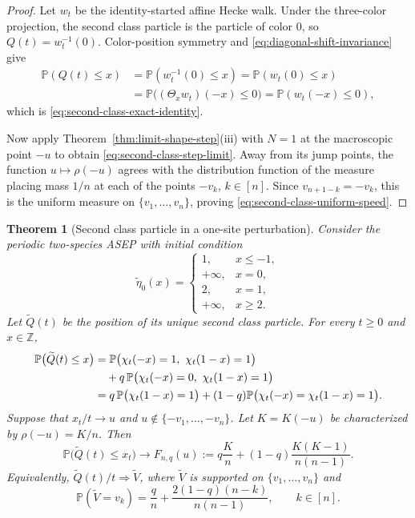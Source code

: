 \documentclass[11pt,a4paper]{amsart}
\newtheorem{theorem}{Theorem}[section]
\theoremstyle{definition}
\theoremstyle{remark}
\numberwithin{equation}{section}
\newcommand{\Z}{\mathbb Z}
\newcommand{\Pp}{\mathbb P}
\begin{document}
	\begin{proof}
		Let $w_t$ be the identity-started affine Hecke walk.  Under the three-color
		projection, the second class particle is the particle of color $0$, so
		$Q(t)=w_t^{-1}(0)$.  Color-position symmetry and
		\eqref{eq:diagonal-shift-invariance} give
		\begin{align*}
			\Pp(Q(t)\le x)
			&=\Pp(w_t^{-1}(0)\le x)
			=\Pp(w_t(0)\le x)\\
			&=\Pp\bigl((\Theta_xw_t)(-x)\le0\bigr)
			=\Pp(w_t(-x)\le0),
		\end{align*}
		which is \eqref{eq:second-class-exact-identity}.
		
		Now apply Theorem~\ref{thm:limit-shape-step}(iii) with $N=1$ at the
		macroscopic point $-u$ to obtain \eqref{eq:second-class-step-limit}.  Away from its jump points, the function $u\mapsto\rho(-u)$ agrees with
		the distribution function of the measure placing mass $1/n$ at each of the
		points $-v_k$, $k\in[n]$.  Since $v_{n+1-k}=-v_k$, this is the uniform
		measure on $\{v_1,\ldots,v_n\}$, proving
		\eqref{eq:second-class-uniform-speed}.
	\end{proof}
	
	\begin{theorem}[Second class particle in a one-site perturbation]
		\label{thm:shifted-second-class}
		Consider the periodic two-species ASEP with initial condition
		\begin{equation}\label{eq:shifted-second-class-initial}
			\widetilde\eta_0(x)=
			\begin{cases}
				1,&x\le-1,\\
				+\infty,&x=0,\\
				2,&x=1,\\
				+\infty,&x\ge2.
			\end{cases}
		\end{equation}
		Let $\widetilde Q(t)$ be the position of its unique second class particle.
		For every $t\ge0$ and $x\in\Z$,
		\begin{align}
			\Pp\bigl(\widetilde Q(t)\le x\bigr)
			&=\Pp\bigl(\chi_t(-x)=1,\ \chi_t(1-x)=1\bigr)\notag\\
			&\quad+q\,\Pp\bigl(\chi_t(-x)=0,\ \chi_t(1-x)=1\bigr)
			\label{eq:shifted-second-class-exact-identity}\\
			&=q\,\Pp\bigl(\chi_t(1-x)=1\bigr)
			+(1-q)\Pp\bigl(\chi_t(-x)=\chi_t(1-x)=1\bigr).
			\notag
		\end{align}
		Suppose that $x_t/t\to u$ and
		$u\notin\{-v_1,\ldots,-v_n\}$.  Let $K=K(-u)$ be characterized by
		$\rho(-u)=K/n$.  Then
		\begin{equation}\label{eq:shifted-second-class-limit}
			\Pp\bigl(\widetilde Q(t)\le x_t\bigr)
			\longrightarrow
			F_{n,q}(u)
			:=q\frac Kn+(1-q)\frac{K(K-1)}{n(n-1)}.
		\end{equation}
		Equivalently, $\widetilde Q(t)/t\Rightarrow\widetilde V$, where
		$\widetilde V$ is supported on $\{v_1,\ldots,v_n\}$ and
		\begin{equation}\label{eq:shifted-second-class-atoms-direct}
			\Pp(\widetilde V=v_k)
			=\frac qn+\frac{2(1-q)(n-k)}{n(n-1)},
			\qquad k\in[n].
		\end{equation}
	\end{theorem}
	
\end{document}
